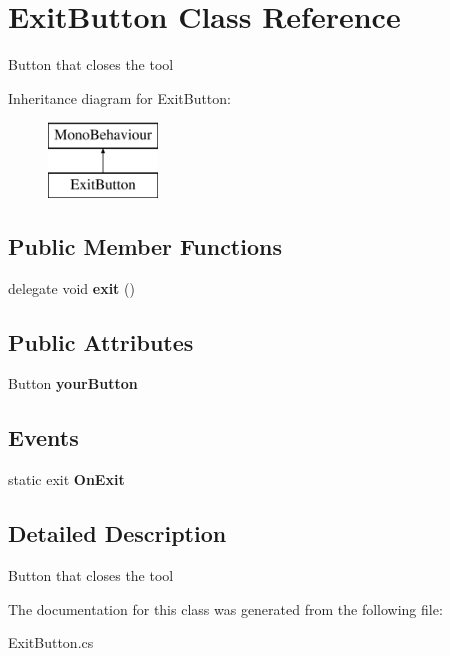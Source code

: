 \hypertarget{class_exit_button}{}\section{Exit\+Button Class Reference}
\label{class_exit_button}


Button that closes the tool  


Inheritance diagram for Exit\+Button\+:\begin{figure}[H]
\begin{center}
\leavevmode
\includegraphics[height=2.000000cm]{class_exit_button}
\end{center}
\end{figure}
\subsection*{Public Member Functions}
\begin{DoxyCompactItemize}
\item 
\mbox{\label{class_exit_button_a689f0ce74a0fa78627bacac651fe25e0}} 
delegate void {\bfseries exit} ()
\end{DoxyCompactItemize}
\subsection*{Public Attributes}
\begin{DoxyCompactItemize}
\item 
\mbox{\label{class_exit_button_ad1a0ea5a36ad96f8d614eead8a744e7d}} 
Button {\bfseries your\+Button}
\end{DoxyCompactItemize}
\subsection*{Events}
\begin{DoxyCompactItemize}
\item 
\mbox{\label{class_exit_button_abbded8cc172dc6f50de83891fb5d8a14}} 
static exit {\bfseries On\+Exit}
\end{DoxyCompactItemize}


\subsection{Detailed Description}
Button that closes the tool 



The documentation for this class was generated from the following file\+:\begin{DoxyCompactItemize}
\item 
Exit\+Button.\+cs\end{DoxyCompactItemize}
